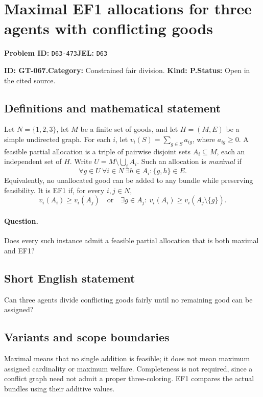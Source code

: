 \documentclass[11pt,a4paper]{article}
\begin{document}
\section*{Maximal EF1 allocations for three agents with conflicting goods}
\textbf{Problem ID:} \texttt{D63-473}\quad \textbf{JEL:} \texttt{D63}\par
\label{problem:OP-0197}
\label{game:GT-067}
{\sffamily\small\color{muted}
\noindent\textbf{ID: GT-067.}\quad\textbf{Category:} Constrained fair division.
\quad\textbf{Kind: P.}\quad\textbf{Status:} Open in the cited source.
\par}
\subsection*{Definitions and mathematical statement}
Let \(N=\{1,2,3\}\), let \(M\) be a finite set of goods, and let
\(H=(M,E)\) be a simple undirected graph. For each \(i\), let
\(v_i(S)=\sum_{g\in S}a_{ig}\), where \(a_{ig}\geq 0\).
A feasible partial allocation is a triple of pairwise disjoint sets
\(A_i\subseteq M\), each an independent set of \(H\).
Write \(U=M\setminus\bigcup_i A_i\). Such an allocation is
\emph{maximal} if
\[
 \forall g\in U\ \forall i\in N\ \exists h\in A_i:
       \{g,h\}\in E.
\]
Equivalently, no unallocated good can be added to any bundle while
preserving feasibility. It is EF1 if, for every \(i,j\in N\),
\[
 v_i(A_i)\geq v_i(A_j)
 \quad\text{or}\quad
 \exists g\in A_j:\ v_i(A_i)\geq v_i(A_j\setminus\{g\}).
\]

\paragraph{Question.}
Does every such instance admit a feasible partial allocation that is
both maximal and EF1?

\subsection*{Short English statement}
Can three agents divide conflicting goods fairly until no remaining
good can be assigned?

\subsection*{Variants and scope boundaries}
Maximal means that no single addition is feasible; it does not mean
maximum assigned cardinality or maximum welfare.
Completeness is not required, since a conflict graph need not admit a
proper three-coloring. EF1 compares the actual bundles using their
additive values.
\end{document}
